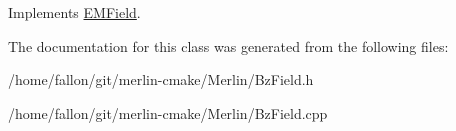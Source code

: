 Implements \hyperlink{classEMField_a3b1045b1ab38a337478c9a94ac6c1852}{E\+M\+Field}.



The documentation for this class was generated from the following files\+:\begin{DoxyCompactItemize}
\item 
/home/fallon/git/merlin-\/cmake/\+Merlin/Bz\+Field.\+h\item 
/home/fallon/git/merlin-\/cmake/\+Merlin/Bz\+Field.\+cpp\end{DoxyCompactItemize}
